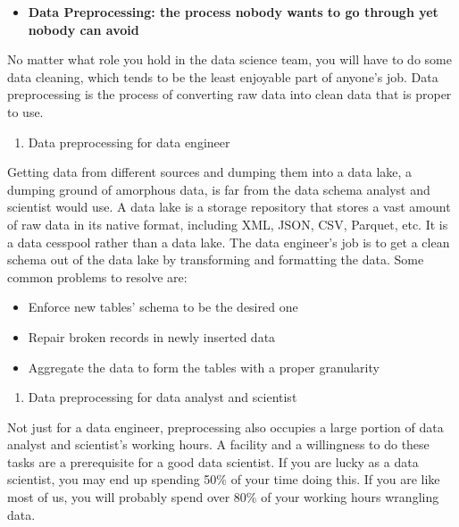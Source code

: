 \documentclass[12pt,]{krantz}
\providecommand{\tightlist}{%
  \setlength{\itemsep}{0pt}\setlength{\parskip}{0pt}}
\begin{document}
\begin{itemize}
\tightlist
\item
  \textbf{Data Preprocessing: the process nobody wants to go through yet nobody can avoid}
\end{itemize}

No matter what role you hold in the data science team, you will have to do some data cleaning, which tends to be the least enjoyable part of anyone's job. Data preprocessing is the process of converting raw data into clean data that is proper to use.

\begin{enumerate}
\def\labelenumi{(\arabic{enumi})}
\tightlist
\item
  Data preprocessing for data engineer
\end{enumerate}

Getting data from different sources and dumping them into a data lake, a dumping ground of amorphous data, is far from the data schema analyst and scientist would use. A data lake is a storage repository that stores a vast amount of raw data in its native format, including XML, JSON, CSV, Parquet, etc. It is a data cesspool rather than a data lake. The data engineer's job is to get a clean schema out of the data lake by transforming and formatting the data. Some common problems to resolve are:

\begin{itemize}
\tightlist
\item
  Enforce new tables' schema to be the desired one
\item
  Repair broken records in newly inserted data
\item
  Aggregate the data to form the tables with a proper granularity
\end{itemize}

\begin{enumerate}
\def\labelenumi{(\arabic{enumi})}
\setcounter{enumi}{1}
\tightlist
\item
  Data preprocessing for data analyst and scientist
\end{enumerate}

Not just for a data engineer, preprocessing also occupies a large portion of data analyst and scientist's working hours. A facility and a willingness to do these tasks are a prerequisite for a good data scientist. If you are lucky as a data scientist, you may end up spending 50\% of your time doing this. If you are like most of us, you will probably spend over 80\% of your working hours wrangling data.
\end{document}
